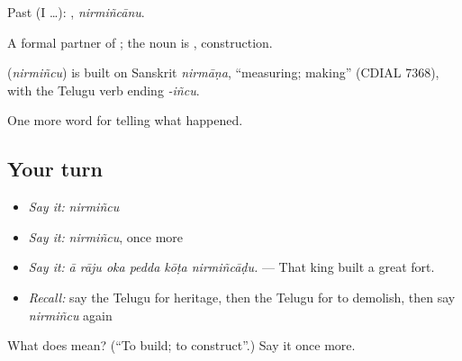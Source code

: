 Past (I …): , \emph{nirmiñcānu}.

A formal partner of ; the noun is , construction.

\begin{cousinweb}
\textbf{} (\emph{nirmiñcu}) is built on Sanskrit \emph{nirmāṇa}, \textquotedblleft{}measuring; making\textquotedblright{} (CDIAL 7368), with the Telugu verb ending \emph{-iñcu}.
\end{cousinweb}

\begin{grammarlens}[title={What you've built}]
One more word for telling what happened.
\end{grammarlens}

\subsection*{Your turn}
\begin{itemize}
\raggedright
  \item \emph{Say it:} \emph{nirmiñcu}
  \item \emph{Say it:} \emph{nirmiñcu}, once more
  \item \emph{Say it:} \emph{ā rāju oka pedda kōṭa nirmiñcāḍu.} — That king built a great fort.
  \item \emph{Recall:} say the Telugu for heritage, then the Telugu for to demolish, then say \emph{nirmiñcu} again
\end{itemize}

\begin{tcolorbox}[breakable,colback=teal!4,colframe=teal!35!black,title={Before you move on}]
What does  mean? (\textquotedblleft{}To build; to construct\textquotedblright{}.) Say it once more.
\end{tcolorbox}
